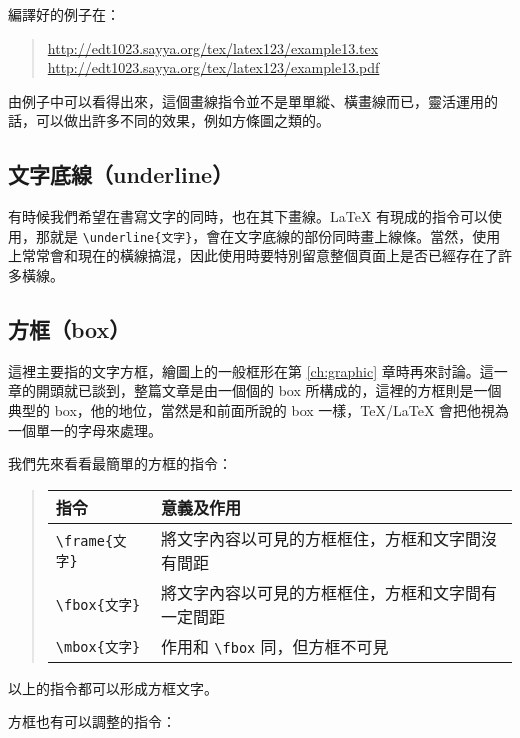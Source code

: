 編譯好的例子在：

\begin{quote}
   \url{http://edt1023.sayya.org/tex/latex123/example13.tex}\\
   \url{http://edt1023.sayya.org/tex/latex123/example13.pdf}
\end{quote}

由例子中可以看得出來，這個畫線指令並不是單單縱、橫畫線而已，靈活運用的話，可以做出許多不同的效果，例如方條圖之類的。

\subsection{文字底線（underline）}

有時候我們希望在書寫文字的同時，也在其下畫線。\LaTeX{} 有現成的指令可以使用，那就是 \verb|\underline{文字}|，會在文字底線的部份同時畫上線條。當然，使用上常常會和現在的橫線搞混，因此使用時要特別留意整個頁面上是否已經存在了許多橫線。

\subsection{方框（box）}

這裡主要指的文字方框，繪圖上的一般框形在第 \ref{ch:graphic} 章時再來討論。這一章的開頭就已談到，整篇文章是由一個個的 box 所構成的，這裡的方框則是一個典型的 box，他的地位，當然是和前面所說的 box 一樣，\TeX/\LaTeX{} 會把他視為一個單一的字母來處理。

我們先來看看最簡單的方框的指令：

\begin{quote}
   \begin{tabular}{ll}
      指令                     & 意義及作用                                         \\
      \hline
      \verb=\frame{文字}= & 將文字內容以可見的方框框住，方框和文字間沒有間距   \\
      \verb=\fbox{文字}= & 將文字內容以可見的方框框住，方框和文字間有一定間距 \\
      \verb=\mbox{文字}= & 作用和 \verb|\fbox| 同，但方框不可見
   \end{tabular}
\end{quote}
%

以上的指令都可以形成方框文字。

方框也有可以調整的指令：

